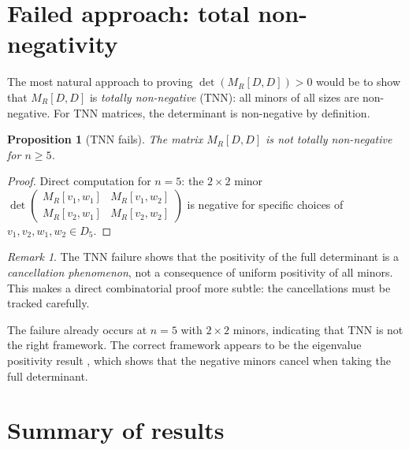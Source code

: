 \documentclass[11pt]{article}
\newtheorem{proposition}[theorem]{Proposition}
\theoremstyle{definition}
\theoremstyle{remark}
\newtheorem{remark}[theorem]{Remark}
\begin{document}
\section{Failed approach: total non-negativity}

\label{sec:tnn-fail}

The most natural approach to proving $\det(M_R[D,D]) > 0$ would be to
show that $M_R[D,D]$ is \emph{totally non-negative} (TNN): all minors
of all sizes are non-negative.  For TNN matrices, the determinant is
non-negative by definition.

\begin{proposition}[TNN fails]\label{prop:tnn-fail}
The matrix $M_R[D,D]$ is \emph{not} totally non-negative for $n \ge 5$.
\end{proposition}

\begin{proof}
Direct computation for $n = 5$: the $2 \times 2$ minor
$\det\!\begin{pmatrix} M_R[v_1, w_1] & M_R[v_1, w_2] \\
  M_R[v_2, w_1] & M_R[v_2, w_2] \end{pmatrix}$
is negative for specific choices of $v_1, v_2, w_1, w_2 \in D_5$.
\end{proof}

\begin{remark}
The TNN failure shows that the positivity of the full determinant is a
\emph{cancellation phenomenon}, not a consequence of uniform positivity
of all minors.  This makes a direct combinatorial proof more subtle:
the cancellations must be tracked carefully.

The failure already occurs at $n = 5$ with $2 \times 2$ minors,
indicating that TNN is not the right framework.  The correct
framework appears to be the eigenvalue positivity result
\cite{Clio-EP}, which shows that the negative minors cancel when
taking the full determinant.
\end{remark}


\section{Summary of results}
\end{document}
